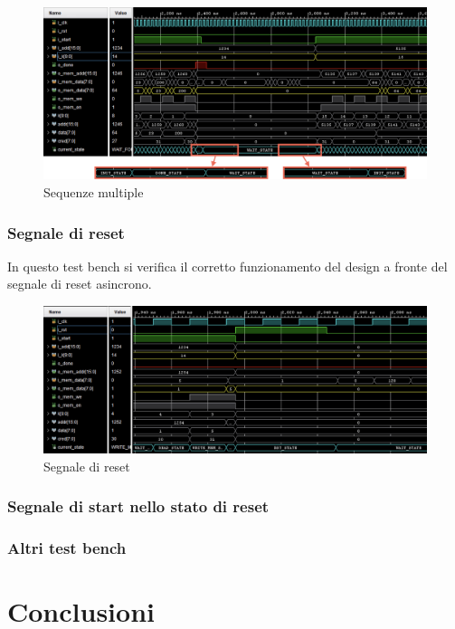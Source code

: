 \documentclass[11pt,a4paper]{article}
\begin{document}
\vspace{0.5em}
\begin{figure}[htbp]
    \centering
    \includegraphics[width=\textwidth]{resources/multiple_sequence.png}
    \caption{Sequenze multiple}
    \label{fig:multiple_sequences}
\end{figure}
\subsubsection{Segnale di reset}

In questo test bench si verifica il corretto funzionamento del design a fronte del segnale di reset asincrono.

\vspace{0.5em}

\begin{figure}[H]
    \centering
    \includegraphics[width=\textwidth]{resources/reset.png}
    \caption{Segnale di reset}
    \label{fig:reset}
\end{figure}

\newpage

\subsubsection{Segnale di start nello stato di reset}

\subsubsection{Altri test bench}

\section{Conclusioni}
\end{document}
